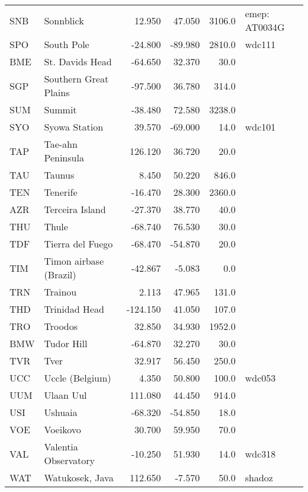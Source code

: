 \begin{table*}[!th]
\begin{tabular}{llrrrl}
SNB & Sonnblick                   &     12.950 &  47.050 &  3106.0 &emep: AT0034G\\
SPO & South Pole                  &    -24.800 & -89.980 &  2810.0 & wdc111\\
BME & St. Davids Head             &    -64.650 &  32.370 &    30.0 &\\
SGP & Southern Great Plains       &    -97.500 &  36.780 &   314.0 &\\
SUM & Summit                      &    -38.480 &  72.580 &  3238.0 &\\
SYO & Syowa Station               &     39.570 & -69.000 &    14.0 & wdc101\\
TAP & Tae-ahn Peninsula           &    126.120 &  36.720 &    20.0 &\\
TAU & Taunus                      &      8.450 &  50.220 &   846.0 &\\
TEN & Tenerife                    &    -16.470 &  28.300 &  2360.0 &\\
AZR & Terceira Island             &    -27.370 &  38.770 &    40.0 &\\
THU & Thule                       &    -68.740 &  76.530 &    30.0 &\\
TDF & Tierra del Fuego            &    -68.470 & -54.870 &    20.0 &\\
TIM & Timon airbase (Brazil)      &    -42.867 &  -5.083 &     0.0 &\\
TRN & Trainou                     &      2.113 &  47.965 &   131.0 &\\
THD & Trinidad Head               &   -124.150 &  41.050 &   107.0 &\\
TRO & Troodos                     &     32.850 &  34.930 &  1952.0 &\\
BMW & Tudor Hill                  &    -64.870 &  32.270 &    30.0 &\\
TVR & Tver                        &     32.917 &  56.450 &   250.0 &\\
UCC & Uccle (Belgium)             &      4.350 &  50.800 &   100.0 & wdc053\\
UUM & Ulaan Uul                   &    111.080 &  44.450 &   914.0 &\\
USI & Ushuaia                     &    -68.320 & -54.850 &    18.0 &\\
VOE & Voeikovo                    &     30.700 &  59.950 &    70.0 &\\
VAL & Valentia Observatory        &    -10.250 &  51.930 &    14.0 & wdc318\\
WAT & Watukosek, Java             &    112.650 &  -7.570 &    50.0 & shadoz\\

\end{tabular}
\end{table*}

